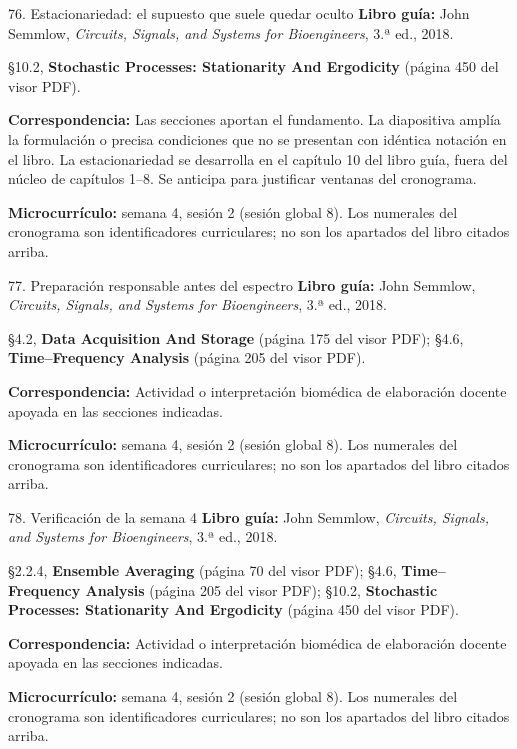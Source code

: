\documentclass[
  10pt,
  ignorenonframetext,
  aspectratio=169,
  spanish,
]{beamer}
\begin{document}
\begin{frame}{76. Estacionariedad: el supuesto que suele quedar oculto}
\label{estacionariedad-el-supuesto-que-suele-quedar-oculto}
\textbf{Libro guía:} John Semmlow, \emph{Circuits, Signals, and Systems
for Bioengineers}, 3.ª ed., 2018.

§10.2, \textbf{Stochastic Processes: Stationarity And Ergodicity}
(página 450 del visor PDF).

\textbf{Correspondencia:} Las secciones aportan el fundamento. La
diapositiva amplía la formulación o precisa condiciones que no se
presentan con idéntica notación en el libro. La estacionariedad se
desarrolla en el capítulo 10 del libro guía, fuera del núcleo de
capítulos 1--8. Se anticipa para justificar ventanas del cronograma.

\textbf{Microcurrículo:} semana 4, sesión 2 (sesión global 8). Los
numerales del cronograma son identificadores curriculares; no son los
apartados del libro citados arriba.
\end{frame}

\begin{frame}{77. Preparación responsable antes del espectro}
\label{preparaciuxf3n-responsable-antes-del-espectro}
\textbf{Libro guía:} John Semmlow, \emph{Circuits, Signals, and Systems
for Bioengineers}, 3.ª ed., 2018.

§4.2, \textbf{Data Acquisition And Storage} (página 175 del visor PDF);
§4.6, \textbf{Time--Frequency Analysis} (página 205 del visor PDF).

\textbf{Correspondencia:} Actividad o interpretación biomédica de
elaboración docente apoyada en las secciones indicadas.

\textbf{Microcurrículo:} semana 4, sesión 2 (sesión global 8). Los
numerales del cronograma son identificadores curriculares; no son los
apartados del libro citados arriba.
\end{frame}

\begin{frame}{78. Verificación de la semana 4}
\label{verificaciuxf3n-de-la-semana-4}
\textbf{Libro guía:} John Semmlow, \emph{Circuits, Signals, and Systems
for Bioengineers}, 3.ª ed., 2018.

§2.2.4, \textbf{Ensemble Averaging} (página 70 del visor PDF); §4.6,
\textbf{Time--Frequency Analysis} (página 205 del visor PDF); §10.2,
\textbf{Stochastic Processes: Stationarity And Ergodicity} (página 450
del visor PDF).

\textbf{Correspondencia:} Actividad o interpretación biomédica de
elaboración docente apoyada en las secciones indicadas.

\textbf{Microcurrículo:} semana 4, sesión 2 (sesión global 8). Los
numerales del cronograma son identificadores curriculares; no son los
apartados del libro citados arriba.
\end{frame}
\end{document}
